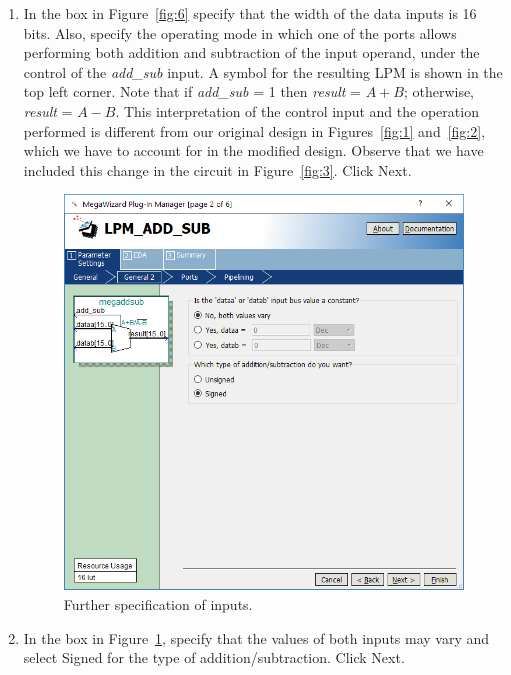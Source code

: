 \documentclass[11pt, twoside, pdftex]{article}
\begin{document}
\begin{enumerate}
\item In the box in Figure~\ref{fig:6} specify that the width of the data inputs is 16 bits.
Also, specify the operating mode in which one of the ports allows performing
both addition and subtraction of the input operand, under the control of 
the {\it add\_sub} input. A symbol for the resulting LPM is shown in the
top left corner. Note that if {\it add\_sub} = 1 then {\it result} = $A + B$;
otherwise, {\it result} = $A - B$. This interpretation of the control input
and the operation performed is different from our original design in 
Figures~\ref{fig:1} and~\ref{fig:2}, which we have to account for in the modified design.
Observe that we have included this change in the circuit in Figure~\ref{fig:3}.
Click {\sf Next}.
 
\begin{figure}[H]
   \begin{center}
      \includegraphics[scale=0.65]{figures/figure7.png}
   \caption{Further specification of inputs.} 
	 \label{fig:7}
	 \end{center}
\end{figure}

\item In the box in Figure~\ref{fig:7}, specify that the values of
both inputs may vary and select {\sf Signed} for the type of addition/subtraction.
Click {\sf Next}.


\end{enumerate}
\end{document}
